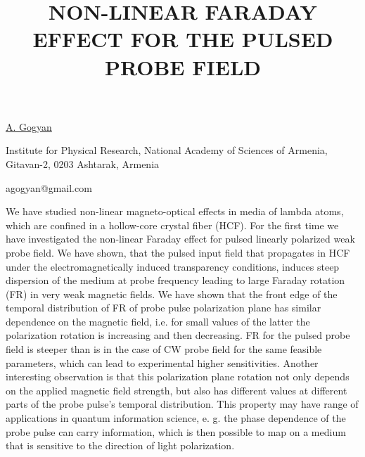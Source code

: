 \title{NON-LINEAR FARADAY EFFECT FOR THE PULSED PROBE FIELD}

\underline{A. Gogyan} 

{\normalsize{\vspace{-4mm}
Institute for Physical Research,
National Academy of Sciences of Armenia,
Gitavan-2, 0203 Ashtarak, Armenia

\email agogyan@gmail.com}}

We have studied non-linear magneto-optical effects in media of lambda atoms, which are confined in a
hollow-core crystal fiber (HCF). For the first time we have investigated the non-linear Faraday
effect for pulsed linearly polarized weak probe field. We have shown, that the pulsed input field
that propagates in HCF under the electromagnetically induced transparency conditions, induces steep
dispersion of the medium at probe frequency leading to large Faraday rotation (FR) in very weak
magnetic fields. We have shown that the front edge of the temporal distribution of FR of probe pulse
polarization plane has similar dependence on the magnetic field, i.e. for small values of the latter
the polarization rotation is increasing and then decreasing. FR for the pulsed probe field is
steeper than is in the case of CW probe field for the same feasible parameters, which can lead to
experimental higher sensitivities. Another interesting observation is that this polarization plane
rotation not only depends on the applied magnetic field strength, but also has different values at
different parts of the probe pulse's temporal distribution. This property may have range of
applications in quantum information science, e. g. the phase dependence of the probe pulse can carry
information, which is then  possible to map on a medium that is sensitive to the direction of light
polarization.

\vspace{\baselineskip}

